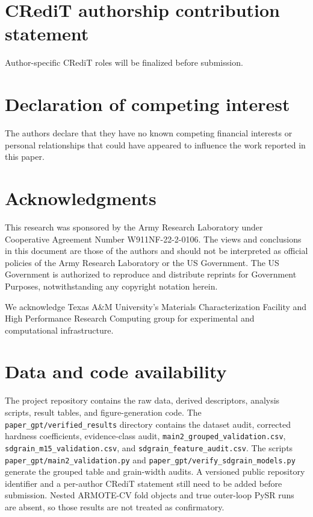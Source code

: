 \documentclass[5p,times,twocolumn]{elsarticle}
\begin{document}
\section*{CRediT authorship contribution statement}
Author-specific CRediT roles will be finalized before submission.

\section*{Declaration of competing interest}
The authors declare that they have no known competing financial interests or personal relationships that could have appeared to influence the work reported in this paper.

\section*{Acknowledgments}
This research was sponsored by the Army Research Laboratory under Cooperative Agreement Number W911NF-22-2-0106. The views and conclusions in this document are those of the authors and should not be interpreted as official policies of the Army Research Laboratory or the US Government. The US Government is authorized to reproduce and distribute reprints for Government Purposes, notwithstanding any copyright notation herein.

We acknowledge Texas A\&M University's Materials Characterization Facility and High Performance Research Computing group for experimental and computational infrastructure.

\section*{Data and code availability}
The project repository contains the raw data, derived descriptors, analysis scripts, result tables, and figure-generation code. The \texttt{paper\_gpt/verified\_results} directory contains the dataset audit, corrected hardness coefficients, evidence-class audit, \texttt{main2\_grouped\_validation.csv}, \texttt{sdgrain\_m15\_validation.csv}, and \texttt{sdgrain\_feature\_audit.csv}. The scripts \texttt{paper\_gpt/main2\_validation.py} and \texttt{paper\_gpt/verify\_sdgrain\_models.py} generate the grouped table and grain-width audits. A versioned public repository identifier and a per-author CRediT statement still need to be added before submission. Nested ARMOTE-CV fold objects and true outer-loop PySR runs are absent, so those results are not treated as confirmatory.



\end{document}
